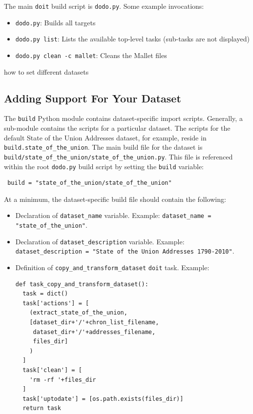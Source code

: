 \documentclass[11pt]{article}
\begin{document}
The main \verb/doit/ build script is \verb/dodo.py/. Some example invocations:
\begin{itemize}
 \item \verb/dodo.py/: Builds all targets
 \item \verb/dodo.py list/: Lists the available top-level tasks (sub-tasks are not displayed)
 \item \verb/dodo.py clean -c mallet/: Cleans the Mallet files
\end{itemize}

%

how to set different datasets

\subsection{Adding Support For Your Dataset}
The \verb/build/ Python module contains dataset-specific import scripts.
Generally, a sub-module contains the scripts for a particular dataset. The
scripts for the default State of the Union Addresses dataset, for example,
reside in \verb/build.state_of_the_union/. The main build file for the dataset
is \verb#build/state_of_the_union/state_of_the_union.py#. This file is
referenced within the root \verb/dodo.py/ build script by setting the
\verb/build/ variable:
\begin{verbatim}
 build = "state_of_the_union/state_of_the_union"
\end{verbatim}

At a minimum, the dataset-specific build file should contain the following:
\begin{itemize}
 \item Declaration of \verb/dataset_name/ variable.
   \newline Example: \verb/dataset_name = "state_of_the_union"/.
 \item Declaration of \verb/dataset_description/ variable.
   \newline Example: \verb/dataset_description = "State of the Union Addresses 1790-2010"/.
 \item Definition of \verb/copy_and_transform_dataset/ \verb/doit/ task.
Example:
\begin{verbatim}
def task_copy_and_transform_dataset():
  task = dict()
  task['actions'] = [
    (extract_state_of_the_union,
    [dataset_dir+'/'+chron_list_filename,
     dataset_dir+'/'+addresses_filename,
     files_dir]
    )
  ]
  task['clean'] = [
    'rm -rf '+files_dir
  ]
  task['uptodate'] = [os.path.exists(files_dir)]
  return task
\end{verbatim}

\end{itemize}
\end{document}
